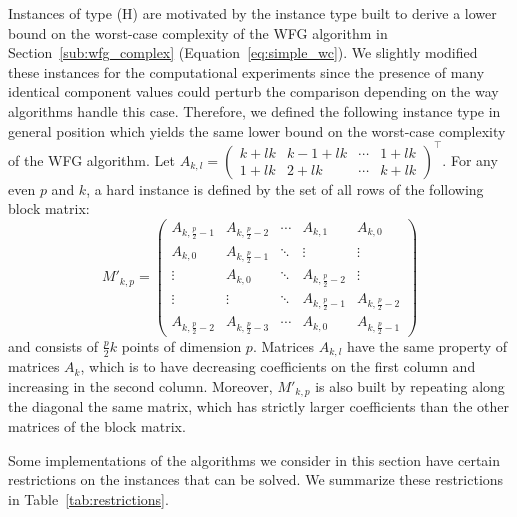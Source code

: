 \documentclass[a4paper,11pt]{article}
\begin{document}
Instances of type (H) are motivated by the instance type built 
to derive a lower bound on the worst-case complexity of the WFG algorithm
in Section~\ref{sub:wfg_complex} (Equation~\ref{eq:simple_wc}).
We slightly modified these instances for the computational experiments
since the presence of many identical component values
could perturb the comparison depending on the way algorithms handle this case.
Therefore, we defined the following instance type in general position
which yields the same lower bound on the worst-case complexity of the WFG algorithm.
Let $A_{k,l} = \begin{pmatrix}
k+lk & k-1+lk & \cdots & 1+lk\\
1+lk & 2+lk   & \cdots & k+lk
\end{pmatrix}^{\intercal}$.
For any even $p$ and $k$, a hard instance 
is defined by the set of all rows of the following block matrix:
$$ M'_{k,p} =
\begin{pmatrix}
  A_{k,\frac{p}{2}-1} & A_{k,\frac{p}{2}-2} & \cdots & A_{k,1}             & A_{k,0} \\
  A_{k,0}             & A_{k,\frac{p}{2}-1} & \ddots & \vdots              & \vdots \\
  \vdots              & A_{k,0}             & \ddots & A_{k,\frac{p}{2}-2} & \vdots \\
  \vdots              & \vdots              & \ddots & A_{k,\frac{p}{2}-1} & A_{k,\frac{p}{2}-2} \\
  A_{k,\frac{p}{2}-2} & A_{k,\frac{p}{2}-3} & \cdots & A_{k,0} & A_{k,\frac{p}{2}-1}
\end{pmatrix}$$
and consists of $\frac{p}{2}k$ points of dimension $p$.
Matrices $A_{k,l}$ have the same property of matrices $A_k$,
which is to have decreasing coefficients on the first column and increasing in the second column.
Moreover, $M'_{k,p}$ is also built by repeating along the diagonal
the same matrix, which has strictly larger coefficients
than the other matrices of the block matrix.

Some implementations of the algorithms we consider in this section 
have certain restrictions on the instances that can be solved. 
We summarize these restrictions in Table~\ref{tab:restrictions}.
\end{document}
